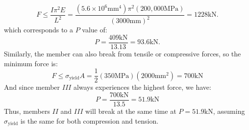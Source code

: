 \documentclass{article}
\begin{document}
\begin{equation}
    F \le \frac{I\pi^2 E}{L^2} = \frac{(5.6\times 10^6\si{\milli\meter\tothe{4}})\pi^2(200,000\si{\mega\pascal})}{(3000\si{\milli\meter})^2} = 1228 \si{\kilo\newton}.
    \label{eq:}
\end{equation}
which corresponds to a $P$ value of:
\begin{equation}
    P = \frac{409\si{\kilo\newton}}{13.13}=93.6\si{\kilo\newton}.
    \label{eq:}
\end{equation}
Similarly, the member can also break from tensile or compressive forces, so the minimum force is:
\begin{equation}
    F \le \sigma_\text{yield}A = \frac{1}{2}(350\si{\mega\pascal})(2000\si{\milli\meter\squared}) = 700\si{\kilo\newton}
    \label{eq:}
\end{equation}
And since member $III$ always experiences the highest force, we have:
\begin{equation}
    P = \frac{700 \si{\kilo\newton}}{13.5} = 51.9\si{\kilo\newton}
    \label{eq:}
\end{equation}
Thus, members $II$ and $III$ will break at the same time at $\boxed{P=51.9\si{\kilo\newton}}$, assuming $\sigma_\text{yield}$ is the same for both compression and tension.

\newpage
\end{document}
